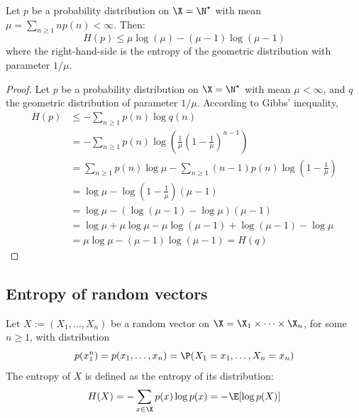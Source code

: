 \documentclass[toc, titlepaged]{../cs-classes/cs-classes}
\begin{document}
\begin{corollary}
    Let $p$ be a probability distribution on $\X=\N^\star$ with mean $\mu=\sum_{n\geq 1} np(n) < \infty$. Then:
    \begin{equation*}
        H(p)\leq\mu\log(\mu)-(\mu-1)\log(\mu-1)
    \end{equation*}
    where the right-hand-side is the entropy of the geometric distribution with parameter $1/\mu$.
\end{corollary}

\begin{proof}
    Let $p$ be a probability distribution on $\X=\N^\star$ with mean $\mu<\infty$, and $q$ the geometric distribution of parameter $1/\mu$. According to Gibbs' inequality,
    \begin{equation*}
        \begin{aligned}
            H(p)&\leq-\sum_{n\geq 1}p(n)\log q(n) \\
            &=-\sum_{n\geq 1}p(n)\log\left(\frac{1}{\mu}\left(1-\frac{1}{\mu}\right)^{n-1}\right)\\
            &=\sum_{n\geq 1}p(n)\log \mu - \sum_{n\geq 1}(n-1) p(n)\log\left(1-\frac{1}{\mu}\right) \\
            &=\log\mu - \log\left(1-\frac{1}{\mu}\right)\left(\mu - 1\right)\\
            &=\log\mu - \left(\log(\mu-1)-\log\mu\right)\left(\mu - 1\right)\\
            &=\log\mu + \mu\log\mu - \mu\log(\mu-1) + \log(\mu-1) - \log\mu\\
            &=\mu\log\mu - (\mu-1)\log(\mu-1) = H(q)
        \end{aligned}
    \end{equation*}
\end{proof}

\subsection{Entropy of random vectors}
\begin{definition}
    Let $X:=(X_1, \dots, X_n)$ be a random vector on $\X=\X_1\times \dots \times \X_n$, for some $n\geq 1$, with distribution
    \begin{equation*}
        p(x_1^n)=p(x_1, \dots, x_n) = \P(X_1=x_1, \dots, X_n=x_n)
    \end{equation*}
    The entropy of $X$ is defined as the entropy of its distribution:
    \begin{equation}
        H(X)=-\sum_{x\in \X}p(x)\log p(x) = -\E[\log p(X)]
    \end{equation}
\end{definition}
\end{document}
